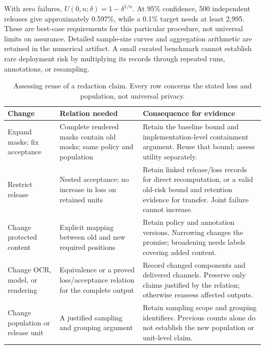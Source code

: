 \documentclass[conference]{IEEEtran}
\begin{document}
With zero failures, $U(0,n;\delta)=1-\delta^{1/n}$. At 95\% confidence, 500 independent releases give approximately 0.597\%, while a 0.1\% target needs at least 2,995. These are best-case requirements for this particular procedure, not universal limits on assurance. Detailed sample-size curves and aggregation arithmetic are retained in the numerical artifact. A small curated benchmark cannot establish rare deployment risk by multiplying its records through repeated runs, annotations, or resampling.

\begin{table}[t]
\centering
\caption{Assessing reuse of a redaction claim. Every row concerns the stated loss and population, not universal privacy.}
\label{tab:updates}
\small
\begin{tabular}{@{}p{}p{}p{}@{}}
\toprule
Change & Relation needed & Consequence for evidence \\
\midrule
Expand masks; fix acceptance & Complete rendered masks contain old masks; same policy and population & Retain the baseline bound and implementation-level containment argument. Reuse that bound; assess utility separately. \\
Restrict release & Nested acceptance; no increase in loss on retained units & Retain linked release/loss records for direct recomputation, or a valid old-risk bound and retention evidence for transfer. Joint failure cannot increase. \\
Change protected content & Explicit mapping between old and new required positions & Retain policy and annotation versions. Narrowing changes the promise; broadening needs labels covering added content. \\
Change OCR, model, or rendering & Equivalence or a proved loss/acceptance relation for the complete output & Record changed components and delivered channels. Preserve only claims justified by the relation; otherwise reassess affected outputs. \\
Change population or release unit & A justified sampling and grouping argument & Retain sampling scope and grouping identifiers. Previous counts alone do not establish the new population or unit-level claim. \\
\bottomrule
\end{tabular}
\end{table}
\end{document}
